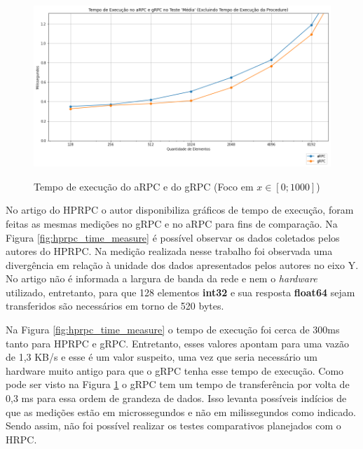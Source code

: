 \begin{figure}[ht]
    \centering
    \caption{Tempo de execução do aRPC e do gRPC (Foco em $x \in [0;1000]$)}
    \includegraphics[width=\textwidth]{figuras/framework/tempo_execucao_abs_zoom_average.png}
    \label{fig:tempo_execucao_abs_zoom_average}
\end{figure}

No artigo do HPRPC o autor disponibiliza gráficos de tempo de execução, foram feitas as mesmas medições no gRPC e no aRPC para fins de comparação. Na Figura \ref{fig:hprpc_time_measure} é possível observar os dados coletados pelos autores do HPRPC. Na medição realizada nesse trabalho foi observada uma divergência em relação à unidade dos dados apresentados pelos autores no eixo Y. No artigo não é informada a largura de banda da rede e nem o \textit{hardware} utilizado, entretanto, para que 128 elementos \textbf{int32} e sua resposta \textbf{float64} sejam transferidos são necessários em torno de 520 bytes. 

Na Figura \ref{fig:hprpc_time_measure} o tempo de execução foi cerca de 300ms tanto para HPRPC e gRPC. Entretanto, esses valores apontam para uma vazão de 1,3 KB/s e esse é um valor suspeito, uma vez que seria necessário um hardware muito antigo para que o gRPC tenha esse tempo de execução. Como pode ser visto na Figura \ref{fig:tempo_execucao_abs_zoom_average} o gRPC tem um tempo de transferência por volta de 0,3 ms para essa ordem de grandeza de dados. Isso levanta possíveis indícios de que as medições estão em microssegundos e não em milissegundos como indicado. Sendo assim, não foi possível realizar os testes comparativos planejados com o HRPC.

